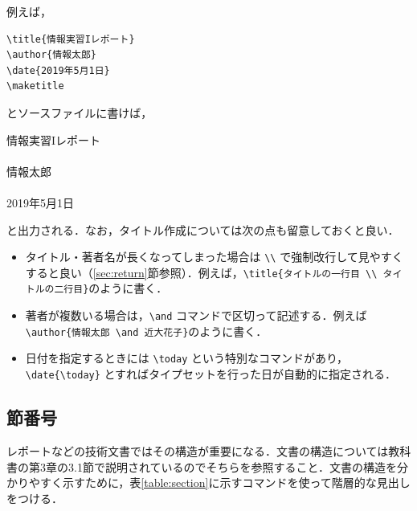 例えば，
\begin{screen}
\begin{verbatim}
\title{情報実習Iレポート}
\author{情報太郎}
\date{2019年5月1日}
\maketitle
\end{verbatim}
\end{screen}
とソースファイルに書けば，
\begin{screen}
\begin{center}
{\Large 情報実習Iレポート}\\
　\\
情報太郎\\
　\\
2019年5月1日
\end{center}
\end{screen}
と出力される．なお，タイトル作成については次の点も留意しておくと良い．
\begin{itemize}
\item タイトル・著者名が長くなってしまった場合は \verb|\\| で強制改行して見やすくすると良い（\ref{sec:return}節参照）．例えば，\verb|\title{タイトルの一行目 \\ タイトルの二行目}|のように書く．
\item 著者が複数いる場合は，\verb|\and| コマンドで区切って記述する．例えば \verb|\author{情報太郎 \and 近大花子}|のように書く．
\item 日付を指定するときには \verb|\today| という特別なコマンドがあり，\verb|\date{\today}| とすればタイプセットを行った日が自動的に指定される．
\end{itemize}

\subsection{節番号}
\label{sec:section}

レポートなどの技術文書ではその構造が重要になる．文書の構造については教科書\cite{TeXText}の第3章の3.1節で説明されているのでそちらを参照すること．文書の構造を分かりやすく示すために，表\ref{table:section}に示すコマンドを使って階層的な見出しをつける．

